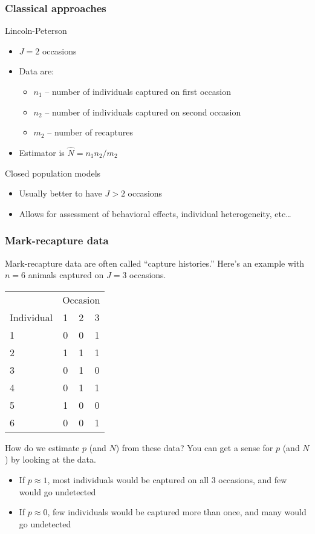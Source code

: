 \documentclass[color=usenames,dvipsnames]{beamer}\usepackage[]{graphicx}\usepackage[]{color}
\begin{document}
\begin{frame}
  \frametitle{Classical approaches}
  Lincoln-Peterson  \\
  \begin{itemize}
    \item $J=2$ occasions
    \item Data are:
      \begin{itemize}
        \item $n_1$ -- number of individuals captured on first occasion
        \item $n_2$ -- number of individuals captured on second occasion
        \item $m_2$ -- number of recaptures
      \end{itemize}
    \item Estimator is $\hat{N} = n_1n_2/m_2$  
  \end{itemize}
  \pause
  \vfill
  Closed population models \\
  \begin{itemize}
    \item Usually better to have $J>2$ occasions
    \item Allows for assessment of behavioral effects, individual heterogeneity, etc\dots
  \end{itemize}
\end{frame}



\begin{frame}
  \frametitle{Mark-recapture data}
  \small
  Mark-recapture data are often called ``capture histories.'' Here's
  an example with $n=6$ animals captured on $J=3$ occasions. \\
  \centering
  \begin{tabular}{lccc}
    \hline
    & \multicolumn{3}{c}{Occasion} \\
    \cline{2-4}
    Individual & 1 & 2 & 3 \\
    \hline
    1 & 0 & 0 & 1 \\
    2 & 1 & 1 & 1 \\
    3 & 0 & 1 & 0 \\
    4 & 0 & 1 & 1 \\
    5 & 1 & 0 & 0 \\
    6 & 0 & 0 & 1 \\
    \hline
  \end{tabular}
  \pause
  \vfill
  \flushleft
  How do we estimate $p$ (and $N$) from these data? %
  \pause
  You can get a sense for $p$ (and $N$) by looking at the data.
  \begin{itemize}
    \setlength\itemsep{.1pt}
    \item If $p\approx 1$, most individuals would be captured
      on all 3 occasions, and few would go undetected
    \item If $p\approx 0$, few individuals would be captured 
      more than once, and many would go undetected
  \end{itemize}
\end{frame}
\end{document}
